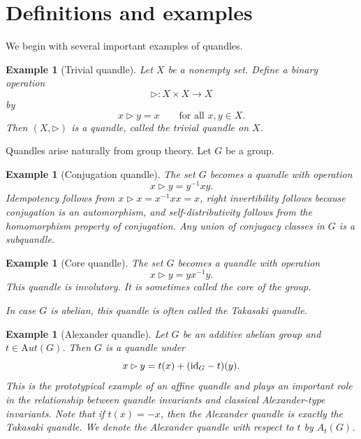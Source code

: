 \documentclass[english,11pt]{amsart}
\newtheorem{Example}[Theorem]{Example}
\newcommand{\id}{{\rm id}}
\newcommand{\Aut}{{\mathrm Aut}}
\begin{document}
\medskip



\bigskip

 \section{Definitions and examples}
\bigskip

We begin with several important examples of quandles.
\begin{Example}[Trivial quandle]
Let $X$ be a nonempty set. Define a binary operation
\[
\rhd \colon X \times X \to X
\]
by
\[
x \rhd y = x \qquad \text{for all } x,y \in X.
\]
Then $(X,\rhd)$ is a quandle, called the \emph{trivial quandle} on $X$.
\end{Example}

Quandles arise naturally from group theory. Let $G$ be a group.

\begin{Example}[Conjugation quandle]
The set $G$ becomes a quandle with operation
\[
x \rhd y = y^{-1}xy.
\]
Idempotency follows from $x \rhd x = x^{-1}xx = x$, right invertibility follows because conjugation is an automorphism, and self-distributivity follows from the homomorphism property of conjugation. Any union of conjugacy classes in $G$ is a subquandle.
\end{Example}

\begin{Example}[Core quandle]
The set $G$ becomes a quandle with operation
\[
x \rhd y = yx^{-1}y.
\]
This quandle is involutory. It is sometimes called the \emph{core} of the group.

In case $G$ is abelian, this quandle is often called the \emph{Takasaki} quandle.
\end{Example}

\begin{Example}[Alexander quandle]
Let $G$ be an additive abelian group and $t \in \Aut(G)$. Then $G$ is a quandle under
\[
x \rhd y = t(x) + (\id_G-t)(y).
\]
This is the prototypical example of an affine quandle and plays an important role in the relationship between quandle invariants and classical Alexander-type invariants. Note that if $t(x)=-x$, then the Alexander quandle is exactly the Takasaki quandle. We denote the Alexander quandle  with respect to $t$ by $A_t(G)$.  
\end{Example}
\end{document}
